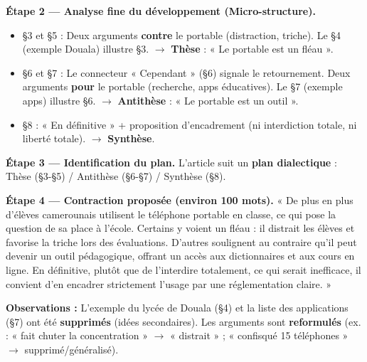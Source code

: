 \documentclass[11pt]{article}
\begin{document}
\begin{exoresolu}
\textbf{Étape 2 — Analyse fine du développement (Micro-structure).}
\begin{itemize}
\item §3 et §5 : Deux arguments \textbf{contre} le portable (distraction, triche). Le §4 (exemple Douala) illustre §3. $\rightarrow$ \textbf{Thèse} : « Le portable est un fléau ».
\item §6 et §7 : Le connecteur « Cependant » (§6) signale le retournement. Deux arguments \textbf{pour} le portable (recherche, apps éducatives). Le §7 (exemple apps) illustre §6. $\rightarrow$ \textbf{Antithèse} : « Le portable est un outil ».
\item §8 : « En définitive » + proposition d'encadrement (ni interdiction totale, ni liberté totale). $\rightarrow$ \textbf{Synthèse}.
\end{itemize}

\textbf{Étape 3 — Identification du plan.}
L'article suit un \textbf{plan dialectique} : Thèse (§3-§5) / Antithèse (§6-§7) / Synthèse (§8).

\textbf{Étape 4 — Contraction proposée (environ 100 mots).}
« De plus en plus d'élèves camerounais utilisent le téléphone portable en classe, ce qui pose la question de sa place à l'école. Certains y voient un fléau : il distrait les élèves et favorise la triche lors des évaluations. D'autres soulignent au contraire qu'il peut devenir un outil pédagogique, offrant un accès aux dictionnaires et aux cours en ligne. En définitive, plutôt que de l'interdire totalement, ce qui serait inefficace, il convient d'en encadrer strictement l'usage par une réglementation claire. »

\textbf{Observations :} L'exemple du lycée de Douala (§4) et la liste des applications (§7) ont été \textbf{supprimés} (idées secondaires). Les arguments sont \textbf{reformulés} (ex. : « fait chuter la concentration » $\rightarrow$ « distrait » ; « confisqué 15 téléphones » $\rightarrow$ supprimé/généralisé).
\end{exoresolu}
\end{document}
